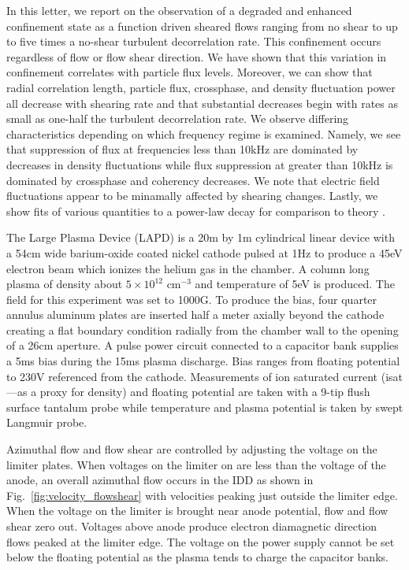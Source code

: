 \documentclass[%
 aps,
 prl,
 amsmath,amssymb,
 reprint,%
]{revtex4-1}
\begin{document}
In this letter, we report on the observation of a degraded and enhanced confinement state as a function driven sheared flows ranging from no shear to up to five times a no-shear turbulent decorrelation rate. This confinement occurs regardless of flow or flow shear direction. We have shown that this variation in confinement correlates with particle flux levels. Moreover, we can show that radial correlation length, particle flux, crossphase, and density fluctuation power all decrease with shearing rate and that substantial decreases begin with rates as small as one-half the turbulent decorrelation rate. We observe differing characteristics depending on which frequency regime is examined. Namely, we see that suppression of flux at frequencies less than 10kHz are dominated by decreases in density fluctuations while flux suppression at greater than 10kHz is dominated by crossphase and coherency decreases. We note that electric field fluctuations appear to be minamally affected by shearing changes. Lastly, we show fits of various quantities to a power-law decay for comparison to theory \cite{biglari90}.

The Large Plasma Device \cite{gek91} (LAPD) is a 20m by 1m cylindrical linear device with a 54cm wide barium-oxide coated nickel cathode pulsed at 1Hz to produce a 45eV electron beam which ionizes the helium gas in the chamber. A column long plasma of density about $5 \times 10^{12}$ cm$^{-3}$ and temperature of 5eV is produced. The field for this experiment was set to 1000G. To produce the bias, four quarter annulus aluminum plates are inserted half a meter axially beyond the cathode creating a flat boundary condition radially from the chamber wall to the opening of a 26cm aperture. A pulse power circuit connected to a capacitor bank supplies a 5ms bias during the 15ms plasma discharge. Bias ranges from floating potential to 230V referenced from the cathode. Measurements of ion saturated current (isat---as a proxy for density) and floating potential are taken with a 9-tip flush surface tantalum probe while temperature and plasma potential is taken by swept Langmuir probe.

Azimuthal flow and flow shear are controlled by adjusting the voltage on the limiter plates. When voltages on the limiter on are less than the voltage of the anode, an overall azimuthal flow occurs in the IDD as shown in
Fig.~\ref{fig:velocity_flowshear}
with velocities peaking just outside the limiter edge. When the voltage on the limiter is brought near anode potential, flow and flow shear zero out. Voltages above anode produce electron diamagnetic direction flows peaked at the limiter edge. The voltage on the power supply cannot be set below the floating potential as the plasma tends to charge the capacitor banks.
\end{document}

